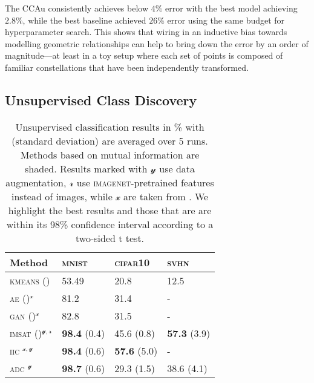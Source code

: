 The \gls{CCAu} consistently achieves below $4\%$ error with the best model achieving $2.8\%$, while the best baseline achieved $26\%$ error using the same budget for hyperparameter search.
This shows that wiring in an inductive bias towards modelling geometric relationships can help to bring down the error by an order of magnitude—at least in a toy setup where each set of points is composed of familiar constellations that have been independently transformed.

\subsection{Unsupervised Class Discovery}
\label{sec:cls_experiments}

\begin{table}
\centering
\begin{minipage}[c]{.28\linewidth}
    \centering
    \caption{
        Unsupervised classification results in \% with (standard deviation) are averaged over 5 runs. Methods based on mutual information are shaded. Results marked with $\mathcal{y}$ use data augmentation, ${\mathcal{r}}$ use \textsc{imagenet}-pretrained features instead of images, while ${\mathcal{x}}$ are taken from \cite{iic}. We highlight the best results and those that are are within its 98\% confidence interval according to a two-sided t test.
    }
    \label{tab:results}
\end{minipage}
\hfill
\begin{minipage}[c]{.7\linewidth}
    \centering
    \small
    \begin{tabular}{@{}llll@{}}
        Method & \textsc{mnist} & \textsc{cifar10} & \textsc{svhn} \\
        \midrule
        \textsc{kmeans} (\cite{adc}) & 53.49 & 20.8 & 12.5 \\
        \textsc{ae} (\cite{ae})$^{\mathcal{x}}$ & 81.2 & 31.4 & - \\
        \textsc{gan} (\cite{gan})$^{\mathcal{x}}$ & 82.8 & 31.5 & - \\
        \rowcolor[HTML]{EFEFEF} 
        \textsc{imsat} (\cite{imsat})$^{\mathcal{y}, \mathcal{r}}$ & \textbf{98.4} (0.4) & 45.6 (0.8) & \textbf{57.3} (3.9) \\ 
        \rowcolor[HTML]{EFEFEF} 
        \textsc{iic} \citep{iic}$^{\mathcal{x}, \mathcal{y}}$ & \textbf{98.4} (0.6) & \textbf{57.6} (5.0) & - \\
        \rowcolor[HTML]{EFEFEF} 
        \textsc{adc} \citep{adc}$^\mathcal{y}$ & \textbf{98.7} (0.6) & 29.3 (1.5) & 38.6 (4.1) \\

\end{tabular}
\end{minipage}
\end{table}
